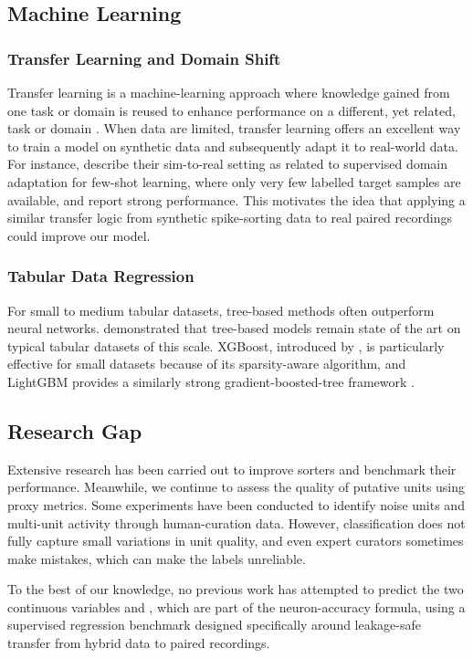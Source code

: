 \subsection{Machine Learning}

\subsubsection{Transfer Learning and Domain Shift}

Transfer learning is a machine-learning approach where knowledge gained from one task or domain is reused to enhance performance on a different, yet related, task or domain \parencite{PanYang2010}. When data are limited, transfer learning offers an excellent way to train a model on synthetic data and subsequently adapt it to real-world data. For instance, \textcite{Zhang2022-wg} describe their sim-to-real setting as related to supervised domain adaptation for few-shot learning, where only very few labelled target samples are available, and report strong performance. This motivates the idea that applying a similar transfer logic from synthetic spike-sorting data to real paired recordings could improve our model.

\subsubsection{Tabular Data Regression}

For small to medium tabular datasets, tree-based methods often outperform neural networks. \textcite{Grinsztajn2022} demonstrated that tree-based models remain state of the art on typical tabular datasets of this scale. XGBoost, introduced by \textcite{ChenGuestrin2016}, is particularly effective for small datasets because of its sparsity-aware algorithm, and LightGBM provides a similarly strong gradient-boosted-tree framework \parencite{Ke2017}.

\subsection{Research Gap}

Extensive research has been carried out to improve sorters and benchmark their performance. Meanwhile, we continue to assess the quality of putative units using proxy metrics. Some experiments have been conducted to identify noise units and multi-unit activity through human-curation data. However, classification does not fully capture small variations in unit quality, and even expert curators sometimes make mistakes, which can make the labels unreliable.

To the best of our knowledge, no previous work has attempted to predict the two continuous variables \fpos{} and \fmiss{}, which are part of the neuron-accuracy formula, using a supervised regression benchmark designed specifically around leakage-safe transfer from hybrid data to paired recordings.
